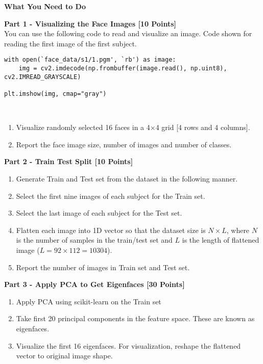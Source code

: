 \documentclass[letter-paper,12pt]{article} %
\begin{document}
\newpage

\begin{center}
    \Large \textbf{What You Need to Do}
\end{center}


\textbf{Part 1 - Visualizing the Face Images [10 Points]}\\
You can use the following code to read and visualize an image. Code shown for reading the first image of the first subject.
\begin{verbatim}
with open(`face_data/s1/1.pgm', `rb') as image:
    img = cv2.imdecode(np.frombuffer(image.read(), np.uint8), cv2.IMREAD_GRAYSCALE)

plt.imshow(img, cmap="gray")
\end{verbatim}\\


\begin{enumerate}
    \item Visualize randomly selected 16 faces in a 4$\times$4 grid [4 rows and 4 columns].
    \item Report the face image size, number of images and number of classes.
\end{enumerate}

\textbf{Part 2 - Train Test Split [10 Points]}
\begin{enumerate}
    \item Generate Train and Test set from the dataset in the following manner.
    \item Select the first nine images of each subject for the Train set.
    \item Select the last image of each subject for the Test set.
    \item Flatten each image into 1D vector so that the dataset size is $N\times L$, where $N$ is the number of samples in the train/test set and $L$ is the length of flattened image ($L=92\times 112 = 10304$).
    \item Report the number of images in Train set and Test set.
\end{enumerate}

\textbf{Part 3 - Apply PCA to Get Eigenfaces [30 Points]}
\begin{enumerate}
    \item Apply PCA using scikit-learn on the Train set
    \item Take first 20 principal components in the feature space. These are known as eigenfaces.
    \item Visualize the first 16 eigenfaces. For visualization, reshape the flattened vector to original image shape.
\end{enumerate}
\end{document}
